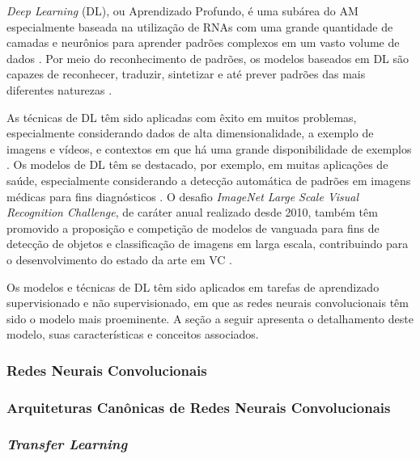 \emph{Deep Learning} (DL), ou Aprendizado Profundo, é uma subárea do AM especialmente baseada na utilização de RNAs com uma grande quantidade de camadas e neurônios para aprender padrões complexos em um vasto volume de dados \cite{ref:chollet,ref:khan,ref:gulli}. Por meio do reconhecimento de padrões, os modelos baseados em DL são capazes de reconhecer, traduzir, sintetizar e até prever padrões das mais diferentes naturezas \cite{ref:JAI-2017}.

As técnicas de DL têm sido aplicadas com êxito em muitos problemas, especialmente considerando dados de alta dimensionalidade, a exemplo de imagens e vídeos, e contextos em que há uma grande disponibilidade de exemplos  \cite{ref:JAI-2017,ref:khan}. Os modelos de DL têm se destacado, por exemplo, em muitas aplicações de saúde, especialmente considerando a detecção automática de padrões em imagens médicas para fins diagnósticos \cite{ref:yang}. O desafio
\emph{ImageNet Large Scale Visual Recognition Challenge}, de caráter anual realizado desde 2010, também têm promovido a proposição e competição de modelos de vanguada para fins de detecção de objetos e classificação de imagens em larga escala, contribuindo para o desenvolvimento do estado da arte em VC \cite{ref:image-net}.

Os modelos e técnicas de DL têm sido aplicados em tarefas de aprendizado supervisionado e não supervisionado, em que as redes neurais convolucionais têm sido o modelo mais proeminente. A seção a seguir apresenta o detalhamento deste modelo, suas características e conceitos associados.

\subsubsection{Redes Neurais Convolucionais} \label{subsec:cnn}


\subsubsection{Arquiteturas Canônicas de Redes Neurais Convolucionais} \label{subsubsec:arquiteturas}


\subsubsection{\textit{Transfer Learning}} \label{subsec:transfer}

